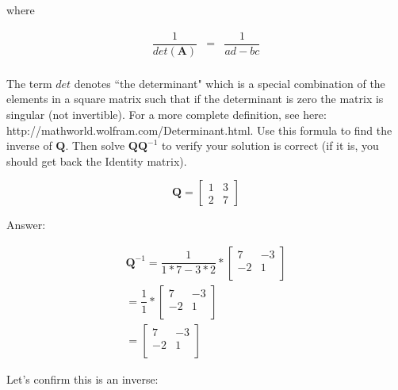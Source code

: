 \documentclass[12pt]{article}
\begin{document}
where

\begin{eqnarray*}
\dfrac{1}{det(\mathbf{A})}&=&\dfrac{1}{ad-bc}\\
\end{eqnarray*}

The term $det$ denotes ``the determinant" which is a special combination of the elements in a square matrix such that if the determinant is zero the matrix is singular (not invertible). For a more complete definition, see here: http://mathworld.wolfram.com/Determinant.html. Use this formula to find the inverse of $\mathbf{Q}$. Then solve $\mathbf{Q}\mathbf{Q}^{-1}$ to verify your solution is correct (if it is, you should get back the Identity matrix).



\begin{minipage}[t]{0.5\textwidth}
$$\mathbf{Q} = \left[\begin{array}{rr}
1 & 3\\
2 & 7 \end{array}\right]$$
\end{minipage}

\bigskip

Answer:


\begin{eqnarray*}
 \mathbf{Q}^{-1}=\dfrac{1}{1*7-3*2}*
\begin{bmatrix} 
7 & -3\\
-2 & 1 \\
\end{bmatrix}\\=
\dfrac{1}{1}*
\begin{bmatrix} 
7 & -3\\
-2 & 1 \\
\end{bmatrix}\\=
\begin{bmatrix} 
7 & -3\\
-2 & 1 \\
\end{bmatrix}
\end{eqnarray*}

\bigskip
Let's confirm this is an inverse:\\
\end{document}
